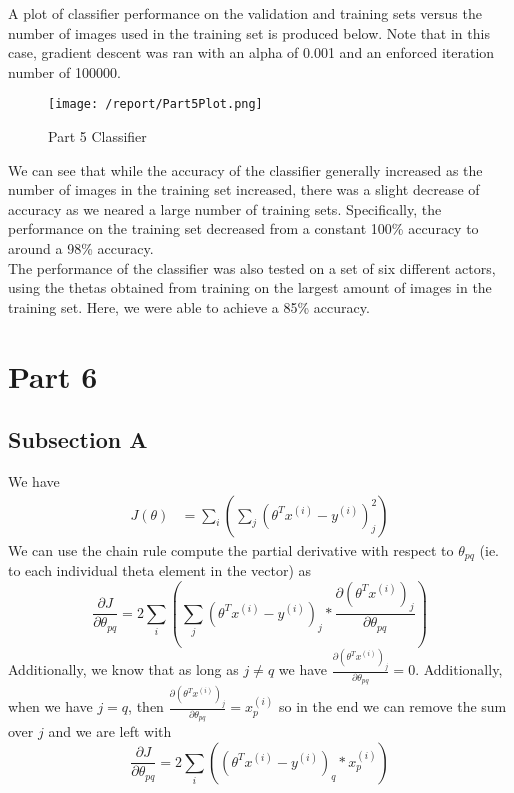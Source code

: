\documentclass[11pt,a4paper]{report}
\begin{document}
A plot of classifier performance on the validation and training sets versus the number of images used in the training set is produced below. Note that in this case, gradient descent was ran with an alpha of 0.001 and an enforced iteration number of 100000.

\begin{figure}[h]
\centering
\texttt{[image: /report/Part5Plot.png]}
\caption{Part 5 Classifier}
\label{fig:test}
\end{figure}

We can see that while the accuracy of the classifier generally increased as the number of images in the training set increased, there was a slight decrease of accuracy as we neared a large number of training sets. Specifically, the performance on the training set decreased from a constant 100\% accuracy to around a 98\% accuracy.\\

The performance of the classifier was also tested on a set of six different actors, using the thetas obtained from training on the largest amount of images in the training set. Here, we were able to achieve a 85\% accuracy. 

\section*{Part 6}
\subsection*{Subsection A}
We have 
\begin{align}
J(\theta)&=\sum_i(\sum_j(\theta^T x^{(i)} - y^{(i)})^2_j)
\end{align}
We can use the chain rule compute the partial derivative with respect to $\theta_{pq}$ (ie. to each individual theta element in the vector) as
\begin{equation}
\frac{\partial J}{\partial \theta_{pq}} = 2 \sum_i(\sum_j(\theta^T x^{(i)} - y^{(i)})_j*\frac{\partial (\theta^T x^{(i)})_j}{\partial \theta_{pq}})
\end{equation} 
Additionally, we know that as long as $j\neq q$ we have $\frac{\partial (\theta^T x^{(i)})_j}{\partial \theta_{pq}} = 0$. Additionally, when we have $j=q$, then $\frac{\partial (\theta^T x^{(i)})_j}{\partial \theta_{pq}} = x^{(i)}_p$ so in the end we can remove the sum over $j$ and we are left with 
\begin{equation}
\frac{\partial J}{\partial \theta_{pq}} = 2 \sum_i((\theta^T x^{(i)} - y^{(i)})_q*x^{(i)}_p)
\end{equation}
\end{document}
